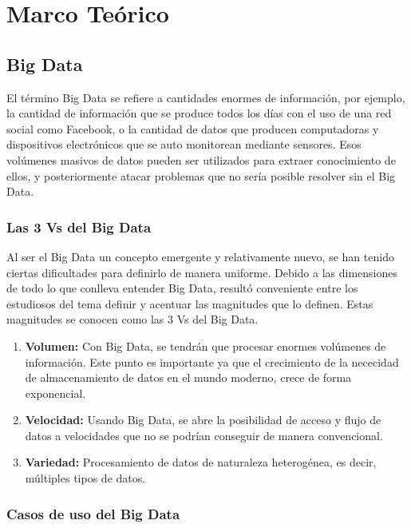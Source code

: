 \hypertarget{seccion:IniciarSesion}{\vspace{1pt}}
\section{Marco Teórico}

\subsection{Big Data}
El término Big Data se refiere a cantidades enormes de información, por ejemplo, la cantidad de información que se produce todos los días con el uso de una red social como Facebook, o la cantidad de datos que producen computadoras y dispositivos electrónicos que se auto monitorean mediante sensores. Esos volúmenes masivos de datos pueden ser utilizados para extraer conocimiento de ellos, y posteriormente atacar problemas que no sería posible resolver sin el Big Data.

\subsubsection{Las 3 Vs del Big Data}
Al ser el Big Data un concepto emergente y relativamente nuevo, se han tenido ciertas dificultades para definirlo de manera uniforme. Debido a las dimensiones de todo lo que conlleva entender Big Data, resultó conveniente entre los estudiosos del tema definir y acentuar las magnitudes que lo definen. Estas magnitudes se conocen como las 3 Vs del Big Data.

\begin{enumerate}
	\item \textbf{Volumen:} Con Big Data, se tendrán que procesar enormes volúmenes de información. Este punto es importante ya que el crecimiento de la nececidad de almacenamiento de datos en el mundo moderno, crece de forma exponencial.
	\item \textbf{Velocidad:} Usando Big Data, se abre la posibilidad de acceso y flujo de datos a velocidades que no se podrían conseguir de manera convencional.
	\item \textbf{Variedad:} Procesamiento de datos de naturaleza heterogénea, es decir, múltiples tipos de datos.
\end{enumerate}

\subsubsection{Casos de uso del Big Data}

